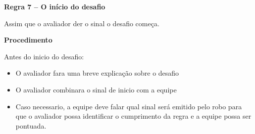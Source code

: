\clearpage
\sffamily
{\bfseries\color[rgb]{0.4,0.4,0.4}
Regra 7 – O início do desafio}
{}

\bigskip

Assim que o avaliador der o sinal o desafio começa.

\bigskip

{\bfseries Procedimento }

\headlinebox

Antes do inicio do desafio:

\begin{itemize}
\item O avaliador fara uma breve explicação sobre o desafio
\item O avaliador combinara o sinal de inicio com a equipe
\item Caso necessario, a equipe deve falar qual sinal será emitido pelo robo para que o avaliador possa identificar o cumprimento da regra e a equipe possa ser pontuada.
\end{itemize}